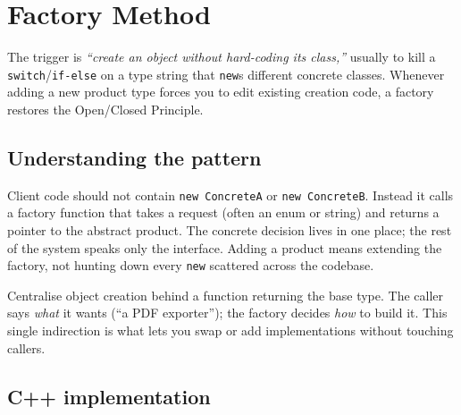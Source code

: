 \section{Factory Method}
\label{sec:pat-factory-method}


\begin{patternbox}
The trigger is \emph{``create an object without hard-coding its class,''}
usually to kill a \texttt{switch}/\texttt{if-else} on a type string that
\texttt{new}s different concrete classes. Whenever adding a new product
type forces you to edit existing creation code, a factory restores the
Open/Closed Principle.
\end{patternbox}

\subsection*{Understanding the pattern}

Client code should not contain \texttt{new ConcreteA} or \texttt{new
ConcreteB}. Instead it calls a factory function that takes a request
(often an enum or string) and returns a pointer to the abstract product.
The concrete decision lives in one place; the rest of the system speaks
only the interface. Adding a product means extending the factory, not
hunting down every \texttt{new} scattered across the codebase.

\begin{ideabox}
Centralise object creation behind a function returning the base type. The
caller says \emph{what} it wants (``a PDF exporter''); the factory decides
\emph{how} to build it. This single indirection is what lets you swap or
add implementations without touching callers.
\end{ideabox}

\subsection*{C++ implementation}

